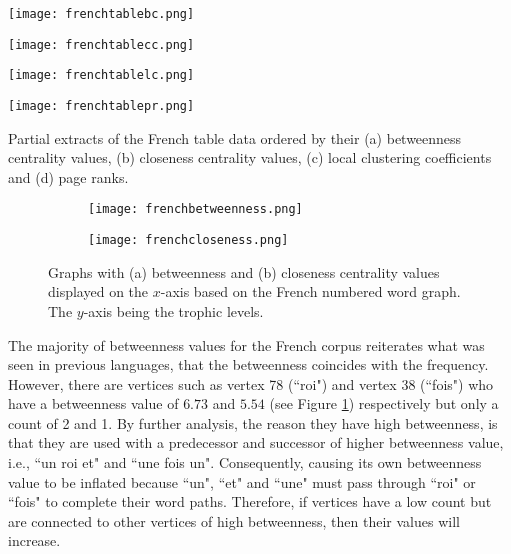 \begin{table}[!htb]
\centering
\begin{subtable}{.27\textwidth}
	\texttt{[image: frenchtablebc.png]}
	\caption{}
	\label{table:frenchtablebc}
\end{subtable}
\hfill
\begin{subtable}{.2\textwidth}
	\centering
	\texttt{[image: frenchtablecc.png]}
	\caption{}
	\label{table:frenchtablecc}
\end{subtable}
\hfill
\begin{subtable}{.2\textwidth}
	\centering
	\texttt{[image: frenchtablelc.png]}
	\caption{}
	\label{table:frenchtablelc}
\end{subtable}
\hfill
\begin{subtable}{.2\textwidth}
	\centering
	\texttt{[image: frenchtablepr.png]}
	\caption{}
	\label{table:frenchtablepr}
\end{subtable}
\caption{Partial extracts of the French table data ordered by their (a) betweenness centrality values, (b) closeness centrality values, (c) local clustering coefficients and (d) page ranks.}
\label{table:frenchdata}
\end{table}

\begin{figure}[!htb]
\centering
\begin{subfigure}{.45\textwidth}
	\hspace{-1cm} 
	\texttt{[image: frenchbetweenness.png]}
	\caption{}
	\label{fig:frbc}
\end{subfigure}
\hfill
\begin{subfigure}{.45\textwidth}
	\hspace{-1cm} 
	\texttt{[image: frenchcloseness.png]}
	\caption{ }
	\label{fig:frcc}
\end{subfigure}
\caption{Graphs with (a) betweenness and (b) closeness centrality values displayed on the $x$-axis based on the French numbered word graph. The $y$-axis being the trophic levels.}
\label{fig:frcentrality}
\end{figure}

The majority of betweenness values for the French corpus reiterates what was seen in previous languages, that the betweenness coincides with the frequency. However, there are vertices such as vertex 78 (``roi") and vertex 38 (``fois") who have a betweenness value of $6.73$ and $5.54$ (see Figure \ref{fig:frbc}) respectively but only a count of 2 and 1. By further analysis, the reason they have high betweenness, is that they are used with a predecessor and successor of higher betweenness value, i.e., ``un roi et" and ``une fois un". Consequently, causing its own betweenness value to be inflated because ``un", ``et" and ``une" must pass through ``roi" or ``fois" to complete their word paths. Therefore, if vertices have a low count but are connected to other vertices of high betweenness, then their values will increase.

